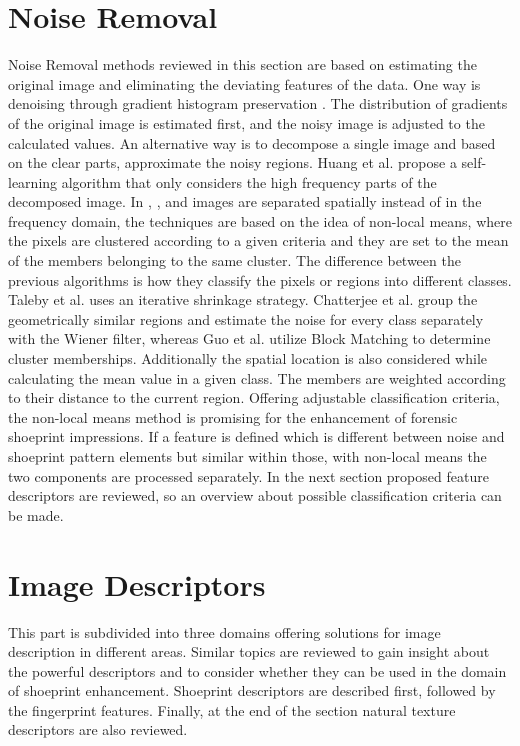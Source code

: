 \documentclass[draft,final]{vutinfth} %
\begin{document}
\section{Noise Removal}

Noise Removal methods reviewed in this section are based on estimating the original image and eliminating the deviating features of the data.
One way is denoising through gradient histogram preservation \cite{zuo2013texture}.
The distribution of gradients  of the original image is estimated first, and the noisy image is adjusted to the calculated values.
An alternative way is to decompose a single image and based on the clear parts, approximate the noisy regions.
Huang et al. \cite{huang2013self} propose a self-learning algorithm that only considers the high frequency parts of the decomposed image.
In \cite{xu2015patch}, \cite{talebi2013global}, \cite{chatterjee2011patch} and \cite{guo2015efficient} images  are separated spatially instead of in the frequency domain, the techniques are based on the idea of non-local means, where the pixels are clustered according to a given criteria and they are set to the mean of the members belonging to the same cluster.
The difference between the previous algorithms is how they classify the pixels or regions into different classes.
Taleby et al. \cite{talebi2013global} uses an iterative shrinkage strategy. 
Chatterjee et al.  \cite{chatterjee2011patch} group the geometrically similar regions and estimate the noise for every class separately with the Wiener filter, whereas Guo et al. \cite{guo2015efficient} utilize Block Matching to determine cluster memberships. 
Additionally the spatial location is also considered while calculating the mean value in a given class.
The members are weighted according to their distance to the current region.
Offering adjustable classification criteria, the non-local means method is promising for the enhancement of forensic shoeprint impressions.
If a feature is defined which is different between noise and shoeprint pattern elements but similar within those, with non-local means the two components are processed separately.
In the next section proposed feature descriptors are reviewed, so an overview about possible classification criteria can be made.

\section{Image Descriptors}

This part is subdivided into three domains offering solutions for image description in different areas.
Similar topics are reviewed to gain insight about the powerful descriptors and to consider whether they can be used in the domain of shoeprint enhancement.
Shoeprint descriptors are described first, followed by the fingerprint features.
Finally, at the end of the section natural texture descriptors are also reviewed. 
\end{document}

